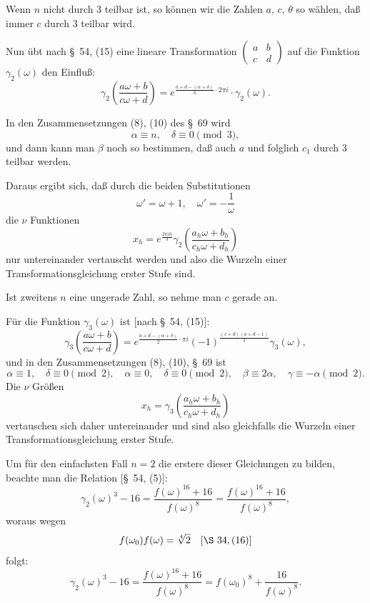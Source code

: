 \documentclass[12pt,a4paper]{article}
\theoremstyle{definition}
\begin{document}
Wenn $n$ nicht durch 3 teilbar ist, so können wir die Zahlen $a$, $c$, $\theta$ so wählen, daß immer $c$ durch 3 teilbar wird.

Nun übt nach \S\ 54, (15) eine lineare Transformation $\begin{pmatrix} a & b \\ c & d \end{pmatrix}$ auf die Funktion $\gamma_2(\omega)$ den Einfluß:
\[
\gamma_2\left(\frac{a\omega + b}{c\omega + d}\right) = e^{\frac{a+d - (\alpha + \delta)}{3} \cdot 2\pi i} \cdot \gamma_2(\omega).
\]

In den Zusammensetzungen (8), (10) des \S\ 69 wird
\[
\alpha \equiv n, \quad \delta \equiv 0 \pmod{3},
\]
und dann kann man $\beta$ noch so bestimmen, daß auch $a$ und folglich $c_1$ durch 3 teilbar werden.

Daraus ergibt sich, daß durch die beiden Substitutionen
\[
\omega' = \omega + 1, \quad \omega' = -\frac{1}{\omega}
\]
die $\nu$ Funktionen
\begin{equation}\label{eq:71-1}
x_h = e^{\frac{2\pi i h}{3}} \gamma_2\left(\frac{a_h \omega + b_h}{c_h \omega + d_h}\right)
\end{equation}
nur untereinander vertauscht werden und also die Wurzeln einer Transformationsgleichung erster Stufe sind.

Ist zweitens $n$ eine ungerade Zahl, so nehme man $c$ gerade an.

Für die Funktion $\gamma_3(\omega)$ ist [nach \S\ 54, (15)]:
\[
\gamma_3\left(\frac{a\omega + b}{c\omega + d}\right) = e^{\frac{a+d-(\alpha+\delta)}{2} \cdot \pi i} (-1)^{\frac{(c+d)(a+d-1)}{2}} \gamma_3(\omega),
\]
und in den Zusammensetzungen (8), (10), \S\ 69 ist
\[
\alpha \equiv 1, \quad \delta \equiv 0 \pmod{2}, \quad \alpha \equiv 0, \quad \delta \equiv 0 \pmod{2}, \quad \beta \equiv 2\alpha, \quad \gamma \equiv -\alpha \pmod{2}.
\]
Die $\nu$ Größen
\begin{equation}\label{eq:71-2}
x_h = \gamma_3\left(\frac{a_h \omega + b_h}{c_h \omega + d_h}\right)
\end{equation}
vertauschen sich daher untereinander und sind also gleichfalls die Wurzeln einer Transformationsgleichung erster Stufe.

Um für den einfachsten Fall $n = 2$ die erstere dieser Gleichungen zu bilden, beachte man die Relation [\S\ 54, (5)]:
\[
\gamma_2(\omega)^3 - 16 = \frac{f(\omega)^{16} + 16}{f(\omega)^8} = \frac{f(\omega)^{16} + 16}{f(\omega)^8},
\]
woraus wegen
\[
f(\omega_0) f(\omega) = \sqrt[4]{2} \quad [\S\ 34, (16)]
\]
folgt:
\[
\gamma_2(\omega)^3 - 16 = \frac{f(\omega)^{16} + 16}{f(\omega)^8} = f(\omega_0)^8 + \frac{16}{f(\omega)^8}.
\]
\end{document}
